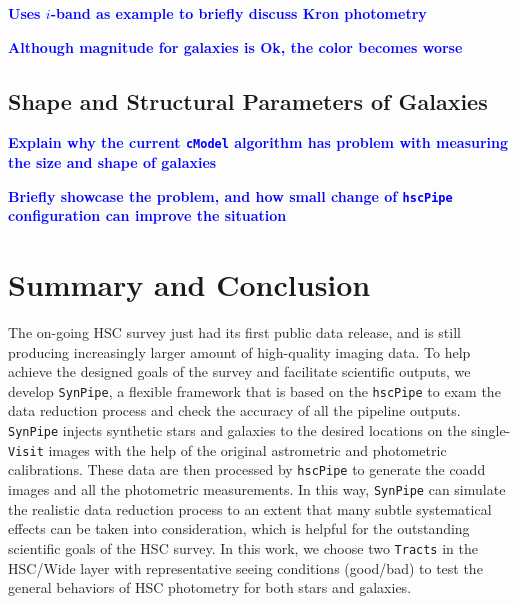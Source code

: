 \documentclass[useamsfonts]{pasj01}
\def\hscpipe{\texttt{hscPipe}}
\def\synpipe{\texttt{SynPipe}}
\def\cmodel{\texttt{cModel}}
\def\visit{\texttt{Visit}}
\def\tracts{\texttt{Tracts}}
\newcommand{\plan}[1]{\textcolor{blue} {\textbf{#1}}}
\begin{document}
    \plan{Uses $i$-band as example to briefly discuss Kron photometry}

    \plan{Although magnitude for galaxies is Ok, the color becomes worse}

\subsection{Shape and Structural Parameters of Galaxies}
    \label{ssec:shape}

    \plan{Explain why the current \cmodel{}{} algorithm has problem with measuring
          the size and shape of galaxies}

    \plan{Briefly showcase the problem, and how small change of \hscpipe{}
          configuration can improve the situation}

\section{Summary and Conclusion}
    \label{sec:summary}

    The on-going HSC survey just had its first public data release, and is still
    producing increasingly larger amount of high-quality imaging data.
    To help achieve the designed goals of the survey and facilitate scientific
    outputs, we develop \synpipe{}, a flexible framework that is based on the
    \hscpipe{} to exam the data reduction process and check the accuracy of all the
    pipeline outputs.
    \synpipe{} injects synthetic stars and galaxies to the desired locations on the
    single-\visit{} images with the help of the original astrometric and
    photometric calibrations.
    These data are then processed by \hscpipe{} to generate the coadd images and
    all the photometric measurements.
    In this way, \synpipe{} can simulate the realistic data reduction process
    to an extent that many subtle systematical effects can be taken into
    consideration, which is helpful for the outstanding scientific goals of the HSC
    survey.
    In this work, we choose two \tracts{} in the HSC/Wide layer with
    representative seeing conditions (good/bad) to test the general behaviors of HSC
    photometry for both stars and galaxies.
\end{document}
